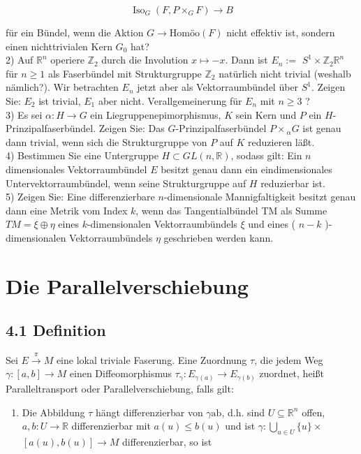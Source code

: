\documentclass[10pt, letterpaper]{article}
\begin{document}
$$
\operatorname{Iso}_{G}\left(F, P \times_{G} F\right) \rightarrow B
$$

für ein Bündel, wenn die Aktion $G \rightarrow \text{Homöo}(F)$ nicht effektiv ist, sondern einen nichttrivialen Kern $G_{0}$ hat?\\
2) Auf $\mathbb{R}^{n}$ operiere $\mathbb{Z}_{2}$ durch die Involution $x \mapsto-x$. Dann ist $E_{n}:=$ $S^{1} \times \mathbb{Z}_{2} \mathbb{R}^{n}$ für $n \geq 1$ als Faserbündel mit Strukturgruppe $\mathbb{Z}_{2}$ natürlich nicht trivial (weshalb nämlich?). Wir betrachten $E_{n}$ jetzt aber als Vektorraumbündel über $S^{1}$. Zeigen Sie: $E_{2}$ ist trivial, $E_{1}$ aber nicht. Verallgemeinerung für $E_{n}$ mit $n \geq 3$ ?\\
3) Es sei $\alpha: H \rightarrow G$ ein Liegruppenepimorphismus, $K$ sein Kern und $P$ ein $H$-Prinzipalfaserbündel. Zeigen Sie: Das $G$-Prinzipalfaserbündel $P \times{ }_{\alpha} G$ ist genau dann trivial, wenn sich die Strukturgruppe von $P$ auf $K$ reduzieren läßt.\\
4) Bestimmen Sie eine Untergruppe $H \subset G L(n, \mathbb{R})$, sodass gilt: Ein $n$ dimensionales Vektorraumbündel $E$ besitzt genau dann ein eindimensionales Untervektorraumbündel, wenn seine Strukturgruppe auf $H$ reduzierbar ist.\\
5) Zeigen Sie: Eine differenzierbare $n$-dimensionale Mannigfaltigkeit besitzt genau dann eine Metrik vom Index $k$, wenn das Tangentialbündel TM als Summe $T M=\xi \oplus \eta$ eines $k$-dimensionalen Vektorraumbündels $\xi$ und eines ( $n-k$ )-dimensionalen Vektorraumbündels $\eta$ geschrieben werden kann.



\pagebreak

\section{Die Parallelverschiebung}
\subsection*{4.1 Definition}
Sei $E \xrightarrow{\pi} M$ eine lokal triviale Faserung. Eine Zuordnung $\tau$, die jedem Weg $\gamma:[a, b] \rightarrow M$ einen Diffeomorphismus $\tau_{\gamma}: E_{\gamma(a)} \rightarrow E_{\gamma(b)}$ zuordnet, heißt Paralleltransport oder Parallelverschiebung, falls gilt:

\begin{enumerate}
  \item Die Abbildung $\tau$ hängt differenzierbar von $\gamma \mathrm{ab}$, d.h. sind $U \subseteq \mathbb{R}^{n}$ offen, $a, b: U \rightarrow \mathbb{R}$ differenzierbar mit $a(u) \leq b(u)$ und ist $\gamma: \bigcup_{u \in U}\{u\} \times$ $[a(u), b(u)] \rightarrow M$ differenzierbar, so ist
\end{enumerate}
\end{document}
